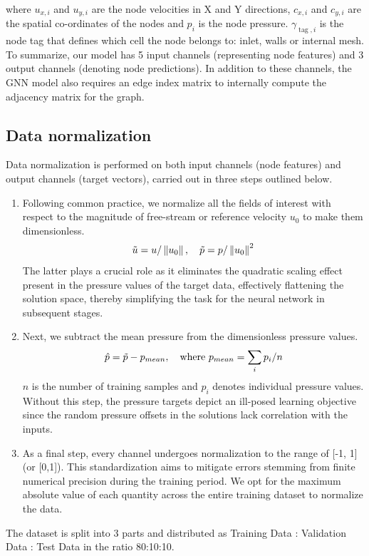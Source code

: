 where $u_{x, i}$ and $u_{y, i}$ are the node velocities in X and Y directions, $c_{x, i}$ and $c_{y, i}$ are the spatial co-ordinates of the nodes and $p_i$ is the node pressure. $\gamma_{\operatorname{tag}, i}$ is the node tag that defines which cell the node belongs to: inlet, walls or internal mesh. To summarize, our model has 5 input channels (representing node features) and 3 output channels (denoting node predictions). In addition to these channels, the GNN model also requires an edge index matrix to internally compute the adjacency matrix for the graph. 
\subsection{Data normalization}
Data normalization is performed on both input channels (node features) and output channels (target vectors), carried out in three steps outlined below.
\begin{enumerate}
\item Following common practice, we normalize all the fields of interest with respect to the magnitude of free-stream or reference velocity $u_0$ to make them dimensionless. 
\begin{equation}
    \Tilde{u}=u /\left\|u_0\right\|, \quad \Tilde{p}=p /\left\|u_0\right\|^2
\end{equation}
The latter plays a crucial role as it eliminates the quadratic scaling effect present in the pressure values of the target data, effectively flattening the solution space, thereby simplifying the task for the neural network in subsequent stages.
\item Next, we subtract the mean pressure from the dimensionless pressure values. 
\begin{equation}
\hat{p} = \Tilde{p} - p_{mean} , \quad \text{where } p_{mean} = \sum_i p_i / n
\end{equation}
$n$ is the number of training samples and $p_i$ denotes individual pressure values. Without this step, the pressure targets depict an ill-posed learning objective since the random pressure offsets in the solutions lack correlation with the inputs.
\item As a final step, every channel undergoes normalization to the range of [-1, 1] (or [0,1]). This standardization aims to mitigate errors stemming from finite numerical precision during the training period. We opt for the maximum absolute value of each quantity across the entire training dataset to normalize the data. 
\end{enumerate}
The dataset is split into 3 parts and distributed as Training Data : Validation Data : Test Data in the ratio 80:10:10. 
